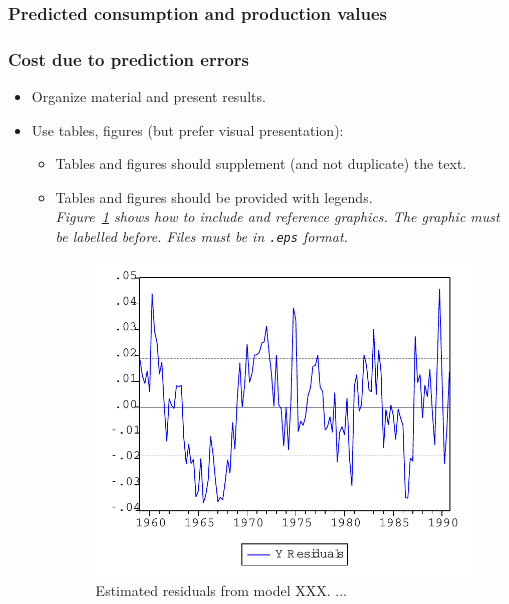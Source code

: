 \subsubsection{Predicted consumption and production values}



\subsubsection{Cost due to prediction errors}




\begin{itemize}

    \item Organize material and present results.

    \item Use tables, figures (but prefer visual presentation):
        \begin{itemize}
            \item Tables and figures should supplement (and not duplicate) the
                text.

            \item Tables and figures should be provided with
            legends.\\
                {\it Figure~\ref{Fig:Resids} shows how to include and reference
                graphics. The graphic must be labelled before. Files must be in
                \texttt{.eps} format.}

                \begin{figure}[ht]
                \begin{center}
                    \includegraphics[scale=0.5,angle=0]{thesis/figures/graph.pdf}
                    \caption{Estimated residuals from model XXX. ...}
                    \label{Fig:Resids}
                \end{center}
                \end{figure}


\end{itemize}
\end{itemize}
